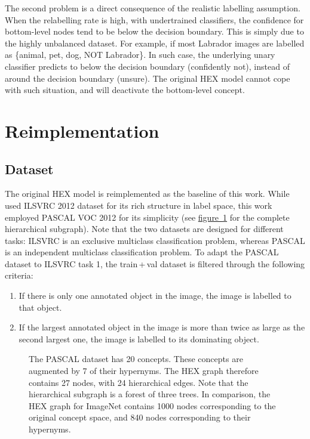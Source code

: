 \documentclass[11pt,a4paper]{article}
\begin{document}
The second problem is a direct consequence of the realistic labelling assumption. When the relabelling rate is high, with undertrained classifiers, the confidence for bottom-level nodes tend to be below the decision boundary. This is simply due to the highly unbalanced dataset. For example, if most Labrador images are labelled as \{animal, pet, dog, NOT Labrador\}. In such case, the underlying unary classifier predicts to below the decision boundary (confidently not), instead of around the decision boundary (unsure). The original HEX model cannot cope with such situation, and will deactivate the bottom-level concept.

\section{Reimplementation}
\subsection{Dataset}
\label{sec:data}

The original HEX model is reimplemented as the baseline of this work. While \cite{deng2014large} used ILSVRC 2012 dataset for its rich structure in label space, this work employed PASCAL VOC 2012 \cite{pascal-voc-2012} for its simplicity (see \hyperref[fig:hex]{figure~\ref{fig:hex}} for the complete hierarchical subgraph). Note that the two datasets are designed for different tasks: ILSVRC is an exclusive multiclass classification problem, whereas PASCAL is an independent multiclass classification problem. To adapt the PASCAL dataset to ILSVRC task 1, the train\,+\,val dataset is filtered through the following criteria:
\begin{enumerate}
\item If there is only one annotated object in the image, the image is labelled to that object.
\item If the largest annotated object in the image is more than twice as large as the second largest one, the image is labelled to its dominating object.
\end{enumerate}
\begin{figure}[htbp]
\centering
\caption{The PASCAL dataset has 20 concepts. These concepts are augmented by 7 of their hypernyms. The HEX graph therefore contains 27 nodes, with 24 hierarchical edges. Note that the hierarchical subgraph is a forest of three trees. In comparison, the HEX graph for ImageNet contains 1000 nodes corresponding to the original concept space, and 840 nodes corresponding to their hypernyms.}
\label{fig:hex}
\end{figure}
\end{document}
